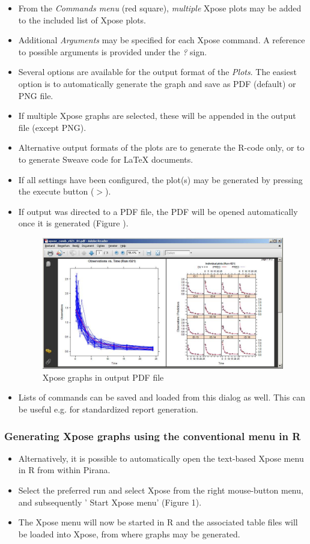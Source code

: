 \begin{itemize}
\begin{figure}[h]
\end{figure}
\item From the \emph{Commands menu} (red square), \emph{multiple}
  Xpose plots may be added to the included list of Xpose plots.
\item Additional \emph{Arguments} may be specified for each Xpose
  command. A reference to possible arguments is provided under the
  \emph{\Large{?}} sign.
\item Several options are available for the output format of the
  \emph{Plots}. The easiest option is to automatically generate the
  graph and save as PDF (default) or PNG file.
\item If multiple Xpose graphs are selected, these will be appended in
  the output file (except PNG).
\item Alternative output formats of the plots are to generate the
  R-code only, or to to generate Sweave code for LaTeX documents.
\item If all settings have been configured, the plot(s) may be
  generated by pressing the execute button (\emph{\Large{$>$}}).
\item If output was directed to a PDF file, the PDF will be opened automatically
  once it is generated (Figure \label{fig:Fig3}).
\begin{figure}[h] \centering
    \includegraphics[scale=.4]{images/xpose_3.jpg}
    \caption{Xpose graphs in output PDF file\label{fig:Fig3}}
\end{figure}
\item Lists of commands can be saved and loaded from this dialog as
  well. This can be useful e.g. for standardized report generation.
\end{itemize}

\subsubsection*{Generating Xpose graphs using the conventional menu in R}
\begin{itemize}
\item Alternatively, it is possible to automatically open the
  text-based Xpose menu in R from within Pirana.
\item Select the preferred run and select Xpose from the right
  mouse-button menu, and subsequently ' Start Xpose menu' (Figure 1).
\item The Xpose menu will now be started in R and the associated table
  files will be loaded into Xpose, from where graphs may be generated.
\end{itemize}
